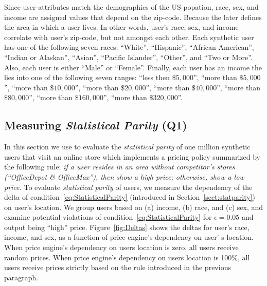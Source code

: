 Since user-attributes match the demographics of the US popation,
race, sex, and income are assigned values that depend on the zip-code. Because
the later defines the area in which a user lives. In other words, user's race,
sex, and income correlate with user's zip-code, but not amongst each other.
Each synthetic user has
one of the following seven races: ``White'', ``Hispanic'', ``African
American'', ``Indian or Alaskan'', ``Asian'', ``Pacific Islander'', ``Other'',
and ``Two or More''. Also, each user is either ``Male'' or ``Female''. Finally,
each user has an income the lies into one of the following seven ranges:
``less then $\$5,000$'', ``more than $\$5,000$'', ``more than $\$10,000$'',
``more than $\$20,000$'', ``more than $\$40,000$'', ``more than $\$80,000$'',
``more than $\$160,000$'', ``more than $\$320,000$''.

\subsection{\normalsize Measuring {\em Statistical Parity} (Q1)}
In this section we use \sysname to evaluate the {\em statistical parity}
of one million synthetic users that visit an online store which
implements a pricing policy summarized by the following rule:
{\it if a user resides in an area without competitor's stores
(``OfficeDepot \& OfficeMax''), then show a high price; otherwise,
show a low price.}
To evaluate {\em statistical parity} of users, we measure the dependency of
the delta of condition~\ref{eq:StatisticalParity} (introduced
in Section~\ref{sect:statparity}) on user's location. We group users
based on (a) income, (b) race, and (c) sex, and examine potential
violations of condition~\ref{eq:StatisticalParity} for $\epsilon=0.05$ and
output being ``high'' price.
Figure~\ref{fig:Deltas} shows the deltas
for user's race, income, and sex, as a function of price engine's dependency
on user' s location. When price engine's dependency on users location is zero,
all users receive random prices. When price engine's dependency on users
location is 100\%, all users receive prices strictly based on the rule
introduced in the previous paragraph.


